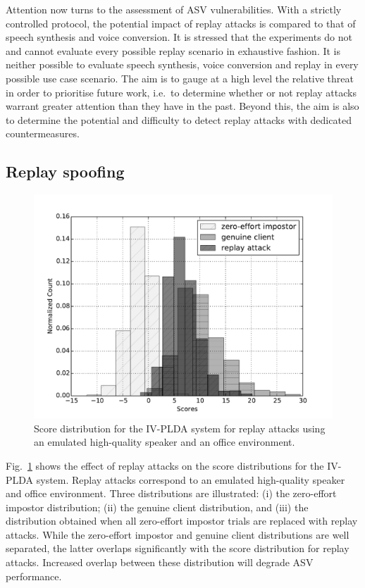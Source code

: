 

Attention now turns to the assessment of ASV vulnerabilities.  With a strictly controlled protocol, the potential impact of replay attacks is compared to that of speech synthesis and voice conversion.  It is stressed that the experiments do not and cannot evaluate every possible replay scenario in exhaustive fashion.  It is neither possible to evaluate speech synthesis, voice conversion and replay in every possible use case scenario.  The aim is to gauge at a high level the relative threat in order to prioritise future work, i.e.\ to determine whether or not replay attacks warrant greater attention than they have  in the past.  Beyond this, the aim is also to determine the potential and difficulty to detect replay attacks with dedicated countermeasures.  


\subsection{Replay spoofing}

\begin{figure}[!t]
	\centering
	\includegraphics[width=1\linewidth]{Figs/dist_IV_off.pdf}
	\caption{Score distribution for the IV-PLDA system for replay attacks using an emulated high-quality speaker and an office environment.}
	\label{fig::Dist_IV}
\end{figure}


Fig.~\ref{fig::Dist_IV} shows the effect of replay attacks on the score distributions for the IV-PLDA system.  Replay attacks correspond to an emulated high-quality speaker and office environment.  Three distributions are illustrated: (i) the zero-effort impostor distribution; (ii) the genuine client distribution, and (iii) the distribution obtained when all zero-effort impostor trials are replaced with replay attacks.  While the zero-effort impostor and genuine client distributions are well separated, the latter overlaps significantly with the score distribution for replay attacks.  Increased overlap between these distribution will degrade ASV performance.


